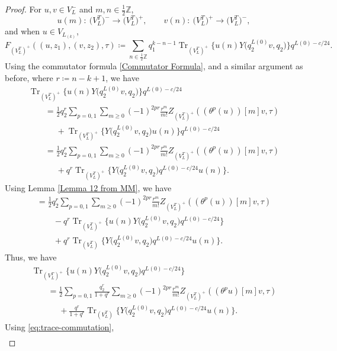 \documentclass[pdftex]{sigma}
\numberwithin{equation}{section}
\theoremstyle{definition}
\begin{document}
\begin{proof}

For $u,v\in V_L^-$ and $m,n\in \frac{1}{2}\mathbb{Z}$,
\[
u(m)\colon \ \bigl(V_L^T\bigr)^-\to \bigl(V_L^T\bigr)^+, \qquad v(n)\colon \ \bigl(V_L^T\bigr)^+\to \bigl(V_L^T\bigr)^-,\]
and when $u\in V_{L_{(k)}}$,
\[F_{(V_L^T)^+}((u,z_1),(v,z_2),\tau)\coloneqq \sum_{n\in \frac{1}{2}\mathbb{Z}}q_1^{k-n-1}\operatorname{Tr}_{(V_L^T)^+}\bigl\{u(n)Y\bigl(q_2^{L(0)}v,q_2\bigr)\bigr\}q^{L(0)-c/24}.\]
Using the commutator formula \eqref{Commutator Formula}, and a similar argument as before, where $r\coloneqq n-k+1$, we have
\begin{gather*}
\operatorname{Tr}_{(V_L^T)^+}\bigl\{u(n) Y\bigl(q_2^{L(0)}v,q_2\bigr)\bigr\}q^{L(0)-c/24}
\\
\qquad=\frac{1}{2}q_2^r\sum_{p=0,1}\sum_{m\geq 0}(-1)^{2pr}\frac{r^m}{m!}Z_{(V_L^T)^+}((\theta^p(u))[m]v, \tau)\\
\phantom{\qquad=}{}+\operatorname{Tr}_{(V_L^T)^+}\bigl\{ Y\bigl(q_2^{L(0)}v,q_2\bigr)u(n)\bigr\}q^{L(0)-c/24}\\
\qquad=\frac{1}{2}q_2^r\sum_{p=0,1}\sum_{m\geq 0}(-1)^{2pr}\frac{r^m}{m!}Z_{(V_L^T)^+}((\theta^p(u))[m]v, \tau)\\
\phantom{\qquad=}{}+q^{r}\operatorname{Tr}_{(V_L^T)^+}\bigl\{ Y\bigl(q_2^{L(0)}v,q_2\bigr)q^{L(0)-c/24}u(n)\bigr\}.
\end{gather*}
Using Lemma \ref{Lemma 12 from MM}, we have
\begin{gather*}
=\frac{1}{2}q_2^r\sum_{p=0,1}\sum_{m\geq 0}(-1)^{2pr}\frac{r^m}{m!}Z_{(V_L^T)^+}((\theta^p(u))[m]v, \tau)\\
\qquad{}-q^{r}\operatorname{Tr}_{(V_L^T)^+}\bigl\{u(n) Y\bigl(q_2^{L(0)}v,q_2\bigr)q^{L(0)-c/24}\bigr\}\\
\qquad{}+q^r\operatorname{Tr}_{(V_L^T)}\bigl\{ Y\bigl(q_2^{L(0)}v,q_2\bigr)q^{L(0)-c/24}u(n)\bigr\}.
\end{gather*}
Thus, we have
\begin{gather*}
\operatorname{Tr}_{(V_L^T)^+}\bigl\{u(n) Y\bigl(q_2^{L(0)}v,q_2\bigr)q^{L(0)-c/24}\bigr\}\\
\qquad= \frac{1}{2} \sum_{p=0,1} \frac{q_2^r}{1 + q^r} \sum_{m \geq 0} (-1)^{2pr} \frac{r^m}{m!} Z_{(V_L^T)^+} ( (\theta^p u)[m] v, \tau ) \\
\phantom{\qquad=}{} + \frac{q^r}{1 + q^r} \operatorname{Tr}_{(V_L^T)} \bigl\{ Y\bigl(q_2^{L(0)} v, q_2\bigr) q^{L(0) - c/24} u(n) \bigr\}.
\end{gather*}
Using \eqref{eq:trace-commutation},
\begin{gather*}

\end{gather*}
\end{proof}
\end{document}
